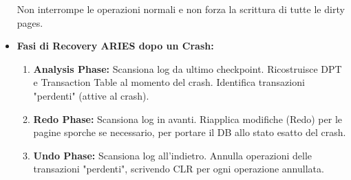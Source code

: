 \begin{itemize}
    Non interrompe le operazioni normali e non forza la scrittura di tutte le dirty pages.
    \item \textbf{Fasi di Recovery ARIES dopo un Crash:}
    \begin{enumerate}
        \item \textbf{Analysis Phase:} Scansiona log da ultimo checkpoint. Ricostruisce DPT e Transaction Table al momento del crash. Identifica transazioni "perdenti" (attive al crash).
        \item \textbf{Redo Phase:} Scansiona log in avanti. Riapplica modifiche (Redo) per le pagine sporche se necessario, per portare il DB allo stato esatto del crash.
        \item \textbf{Undo Phase:} Scansiona log all'indietro. Annulla operazioni delle transazioni "perdenti", scrivendo CLR per ogni operazione annullata.
    \end{enumerate}
\end{itemize}

